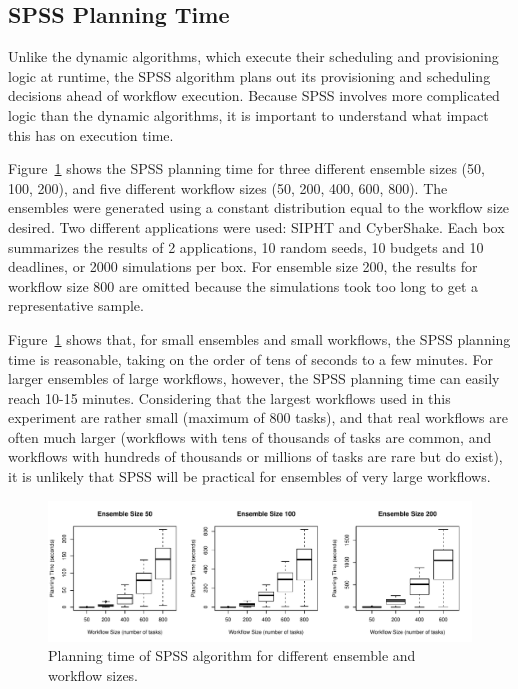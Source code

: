 \documentclass[conference]{IEEEtran}
\begin{document}
\subsection{SPSS Planning Time}

Unlike the dynamic algorithms, which execute their scheduling and provisioning logic at runtime, the SPSS algorithm plans out its provisioning and scheduling decisions ahead of workflow execution. Because SPSS involves more complicated logic than the dynamic algorithms, it is important to understand what impact this has on execution time.

Figure~\ref{fig:spss_planning_time} shows the SPSS planning time for three different ensemble sizes (50, 100, 200), and five different workflow sizes (50, 200, 400, 600, 800). The ensembles were generated using a constant distribution equal to the workflow size desired. Two different applications were used: SIPHT and CyberShake. Each box summarizes the results of 2 applications, 10 random seeds, 10 budgets and 10 deadlines, or 2000 simulations per box. For ensemble size 200, the results for workflow size 800 are omitted because the simulations took too long to get a representative sample.

Figure~\ref{fig:spss_planning_time} shows that, for small ensembles and small workflows, the SPSS planning time is reasonable, taking on the order of tens of seconds to a few minutes. For larger ensembles of large workflows, however, the SPSS planning time can easily reach 10-15 minutes. Considering that the largest workflows used in this experiment are rather small (maximum of 800 tasks), and that real workflows are often much larger (workflows with tens of thousands of tasks are common, and workflows with hundreds of thousands or millions of tasks are rare but do exist), it is unlikely that SPSS will be practical for ensembles of very large workflows.

\begin{figure}[t]
    \includegraphics[width=\textwidth]{spss_planning_time}
    \caption{Planning time of SPSS algorithm for different ensemble and workflow sizes.}
    \label{fig:spss_planning_time}
\end{figure}
\end{document}
